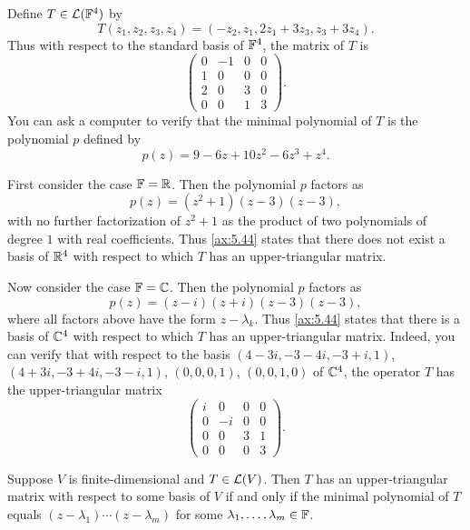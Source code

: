 \begin{example}%
\label{ax:5.43}
Define $T\in\mathcal{L}(\mathbb{F}^4)$ by
\[ T(z_1,z_2,z_3,z_4)=(-z_2,z_1,2z_1+3z_3,z_3+3z_4). \]
Thus with respect to the standard basis of $\mathbb{F}^4$, the matrix of $T$ is
\[ \begin{pmatrix} 0&-1&0&0\\ 1&0&0&0\\ 2&0&3&0\\ 0&0&1&3 \end{pmatrix}. \]
You can ask a computer to verify that the minimal polynomial of $T$ is the
polynomial $p$ defined by
\[ p(z)=9-6z+10z^2-6z^3+z^4. \]

First consider the case $\mathbb{F}=\mathbb{R}$. Then the polynomial $p$ factors as
\[ p(z)=(z^2+1)(z-3)(z-3), \]
with no further factorization of $z^2+1$ as the product of two polynomials of
degree $1$ with real coefficients. Thus \ref{ax:5.44} states that there does not
exist a basis of $\mathbb{R}^4$ with respect to which $T$ has an upper-triangular matrix.

Now consider the case $\mathbb{F}=\mathbb{C}$. Then the polynomial $p$ factors as
\[ p(z)=(z-i)(z+i)(z-3)(z-3), \]
where all factors above have the form $z-\lambda_k$. Thus \ref{ax:5.44} states
that there is a basis of $\mathbb{C}^4$ with respect to which $T$ has an
upper-triangular matrix. Indeed, you can verify that with respect to the basis
$(4-3i,-3-4i,-3+i,1)$, $(4+3i,-3+4i,-3-i,1)$, $(0,0,0,1)$, $(0,0,1,0)$ of $\mathbb{C}^4$,
the operator $T$ has the upper-triangular matrix
\[ \begin{pmatrix} i&0&0&0\\ 0&-i&0&0\\ 0&0&3&1\\ 0&0&0&3 \end{pmatrix}. \]
\end{example}

\begin{result}\label{ax:5.44}
Suppose $V$ is finite-dimensional and $T\in\mathcal{L}(V)$. Then $T$ has an
upper-triangular matrix with respect to some basis of $V$ if and only if the
minimal polynomial of $T$ equals $(z-\lambda_1)\cdots(z-\lambda_m)$ for some
$\lambda_1,\dots,\lambda_m\in\mathbb{F}$.
\end{result}

